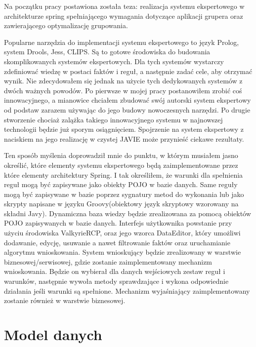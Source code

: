 Na początku pracy postawiona została teza: realizacja systemu ekspertowego w architekturze spring spełniającego wymagania dotyczące aplikacji grupera oraz zawierającego optymalizację grupowania.

Popularne narzędzia do implementacji systemu ekspertowego to język Prolog, system Drools, Jess, CLIPS. Są to gotowe środowiska do budowania skomplikowanych systemów ekspertowych. Dla tych systemów wystarczy zdefiniować wiedzę w postaci faktów i reguł, a następnie zadać cele, aby otrzymać wynik. Nie zdecydowałem się jednak na użycie tych dedykowanych systemów z dwóch ważnych powodów. Po pierwsze w mojej pracy postanowiłem zrobić coś innowacyjnego, a mianowice chciałem zbudować swój autorski system ekspertowy od podstaw zarazem używając do jego budowy nowoczesnych narzędzi. Po drugie stworzenie chociaż zalążka takiego innowacyjnego systemu w najnowszej technologii będzie już sporym osiągnięciem. Spojrzenie na system ekspertowy z naciskiem na jego realizację w czystej JAVIE może przynieść ciekawe rezultaty. 

Ten sposób myślenia doprowadził mnie do punktu, w którym musiałem jasno określić, które elementy systemu ekspertowego będą zaimplementowane przez które elementy architektury Spring. I tak określiłem, że warunki dla spełnienia reguł mogą być zapisywane jako obiekty POJO w bazie danych. Same reguły mogą być zapisywane w bazie poprzez sygnatury metod do wykonania lub jako skrypty napisane w języku Groovy(obiektowy język skryptowy wzorowany na składni Javy). Dynamiczna baza wiedzy będzie zrealizowana za pomocą obiektów POJO zapisywanych w bazie danych. Interfejs użytkownika  powstanie przy użyciu środowiska ValkyrieRCP, oraz jego wzorca DataEditor, który umożliwi dodawanie, edycję, usuwanie a nawet filtrowanie faktów oraz uruchamianie algorytmu wnioskowania. System wnioskujący będzie zrealizowany w warstwie biznesowej/serwisowej, gdzie zostanie zaimplementowany mechanizm wnioskowania. Będzie on wybierał dla danych wejściowych zestaw reguł i warunków, następnie wywoła metody sprawdzające i wykona odpowiednie działania jeśli warunki są spełnione. Mechanizm wyjaśniający zaimplementowany zostanie również w warstwie biznesowej.


\section{Model danych}
\label{sec:modelDanych}

